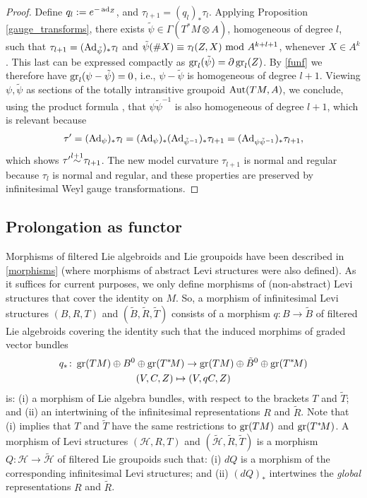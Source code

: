 \documentclass[leqno,12pt]{amsart} %
\begin{document}
\begin{proof}
  Define $q_l := e^{-\operatorname{ad}_Z}$, and $\tau_{l+1}=(q_l)_*\tau_l$. Applying Proposition
  \ref{gauge_transforms}, there exists $\tilde \psi \in \Gamma(T^*\!M \otimes A)$,
  homogeneous of degree $l$, such that $\tau_{l+1} = (\operatorname{Ad}_{\tilde \psi})_*\tau_l$ and
  $\tilde \psi(\#X) \equiv \tau_l(Z, X) ~\mathrm{mod}~ A^{k+l+1}$, whenever $X \in A^k$. This
  last can be expressed compactly as $\operatorname{\operatorname{gr}}_l(\tilde \psi) = \partial \operatorname{\operatorname{gr}}_l(Z)$. By
  \eqref{funf} we therefore have $\operatorname{\operatorname{gr}}_l(\psi - \tilde \psi) = 0$, i.e.,
  $\psi - \tilde \psi $ is homogeneous of degree $l + 1$. Viewing $\psi, \tilde \psi $ as
  sections of the totally intransitive groupoid $\operatorname{Aut}(TM, A)$, we conclude, using
  the product formula , that $\psi \tilde \psi^{-1}$ is also
  homogeneous of degree $l + 1$, which is relevant because
  \begin{equation*}
    \tau' = (\operatorname{Ad}_\psi)_*\tau_l =
      (\operatorname{Ad}_\psi)_*(\operatorname{Ad}_{\tilde \psi^{-1}})_*\tau_{l+1}
    = (\operatorname{Ad}_{\psi \tilde \psi^{-1}})_*\tau_{l+1},
  \end{equation*}
  which shows $\tau' {\overset{l+1}{\,\sim\,}} \tau_{l+1}$. The new model curvature $\tau_{l+1}$ is
  normal and regular because $\tau_l$ is normal and regular, and these properties are
  preserved by infinitesimal Weyl gauge transformations.
\end{proof}


\subsection{Prolongation as functor}\label{functor}
Morphisms of filtered Lie algebroids and Lie groupoids have been described in
\ref{morphisms} (where morphisms of abstract Levi structures were also defined). As it
suffices for current purposes, we only define morphisms of (non-abstract) Levi structures
that cover the identity on $M$. So, a {\df morphism} of infinitesimal Levi structures
$(B, R, T)$ and $(\tilde B, \tilde R, \tilde T)$ consists of a morphism
$q \colon B \rightarrow \tilde B$ of filtered Lie algebroids covering the identity such
that the induced morphims of graded vector bundles
\begin{gather*}
  q_* \colon \operatorname{\operatorname{gr}}(TM)\oplus B^0 \oplus \operatorname{\operatorname{gr}}(T^*\!M)
     \rightarrow \operatorname{\operatorname{gr}}(TM)\oplus \tilde B^0 \oplus \operatorname{\operatorname{gr}}(T^*\!M)\\
  (V, C, Z) \mapsto (V, qC, Z)
\end{gather*}
is: (i) a morphism of Lie algebra bundles, with respect to the brackets $T$ and
$\tilde T$; and (ii) an intertwining of the infinitesimal representations $R$ and
$\tilde R$. Note that (i) implies that $T$ and $\tilde T$ have the same restrictions to
$\operatorname{\operatorname{gr}}(TM)$ and $\operatorname{\operatorname{gr}}(T^*\!M)$. A {\df morphism} of Levi structures
$({\mathcal H}, R, T)$ and $(\tilde {\mathcal H}, \tilde R, \tilde T)$ is a morphism
$Q \colon {\mathcal H} \rightarrow \tilde {\mathcal H} $ of filtered Lie groupoids such
that: (i) $dQ$ is a morphism of the corresponding infinitesimal Levi structures; and (ii)
$(dQ)_*$ intertwines the {\em global} representations $R$ and $\tilde R$.
\end{document}
